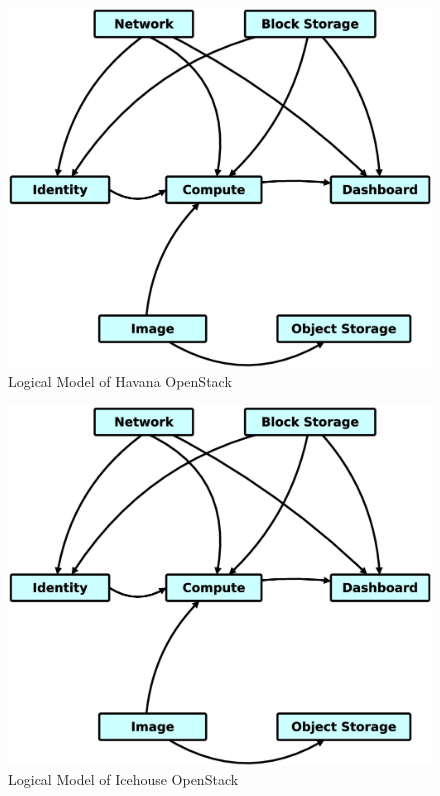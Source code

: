 \begin{figure}[!h]
\centering
\includegraphics[scale=.2]{img/openstack_logical_model.eps}
\caption{Logical Model of Havana OpenStack}
\label{fig:cm}
\end{figure}


\begin{figure}[!h]
\centering
\includegraphics[scale=.2]{img/openstack_logical_model.eps}
\caption{Logical Model of Icehouse OpenStack}
\label{fig:cm}
\end{figure}


